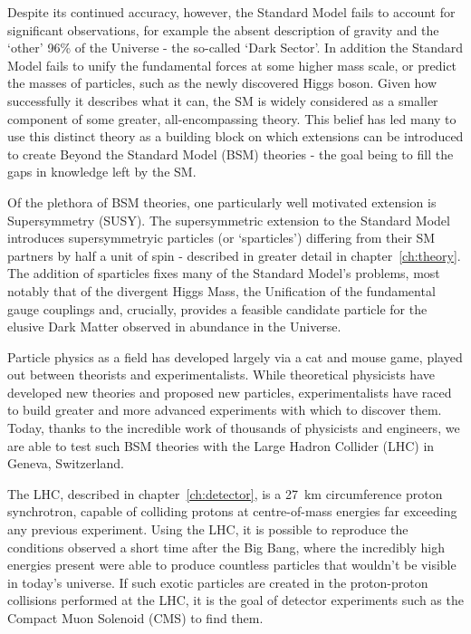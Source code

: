Despite its continued accuracy, however,
the Standard Model fails to account for significant observations, for example
the absent description of gravity and the `other' 96\% of the
Universe - the so-called `Dark Sector'. In addition the Standard Model fails to
unify the fundamental forces at some higher mass scale, or predict the masses of
particles, such as
the newly discovered Higgs boson. Given how successfully it describes
what it can, the SM is widely considered as a smaller component of some greater,
all-encompassing theory. This belief has led many to use this distinct theory as
a building block on which extensions can be introduced to create Beyond the
Standard Model (BSM) theories - the goal being to fill the gaps in knowledge
left by the SM.

Of the plethora of BSM theories, one particularly well motivated extension is
Supersymmetry (SUSY). The supersymmetric extension to the Standard
Model introduces supersymmetryic particles (or `sparticles') differing from
their SM partners by half a unit of spin - described in greater detail in
chapter~\ref{ch:theory}. The addition of sparticles fixes
many of the Standard Model's problems, most notably that of the
divergent Higgs Mass, the Unification of the fundamental gauge couplings and,
crucially, provides a feasible candidate particle for the elusive Dark Matter
observed in abundance in the Universe.

Particle physics as a field has developed largely via a cat and mouse game,
played out between theorists and experimentalists. While theoretical physicists
have developed new theories and proposed new particles, experimentalists have
raced to build greater and more advanced experiments with which to discover
them.
Today, thanks to the incredible work of thousands of physicists and
engineers, we are able to test such BSM theories with the Large
Hadron Collider (LHC) in Geneva, Switzerland.

The LHC, described in chapter~\ref{ch:detector}, is a 27~km
circumference proton synchrotron, capable of colliding protons
at centre-of-mass energies far exceeding any previous experiment.
Using the LHC, it is possible to reproduce the conditions observed a short time
after the Big Bang, where the incredibly high energies present were able to
produce countless particles that wouldn't be visible in today's universe. If
such exotic particles are created in the proton-proton collisions performed at
the LHC, it is the goal of detector experiments such as the Compact Muon
Solenoid (CMS) to find them.

